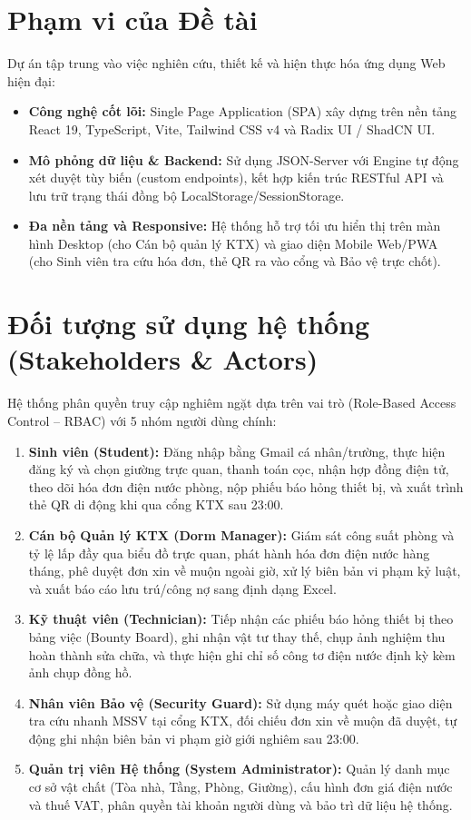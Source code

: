 \documentclass[12pt,a4paper,oneside]{report}
\begin{document}
\section{Phạm vi của Đề tài}
Dự án tập trung vào việc nghiên cứu, thiết kế và hiện thực hóa ứng dụng Web hiện đại:
\begin{itemize}
    \item \textbf{Công nghệ cốt lõi:} Single Page Application (SPA) xây dựng trên nền tảng React 19, TypeScript, Vite, Tailwind CSS v4 và Radix UI / ShadCN UI.
    \item \textbf{Mô phỏng dữ liệu \& Backend:} Sử dụng JSON-Server với Engine tự động xét duyệt tùy biến (custom endpoints), kết hợp kiến trúc RESTful API và lưu trữ trạng thái đồng bộ LocalStorage/SessionStorage.
    \item \textbf{Đa nền tảng và Responsive:} Hệ thống hỗ trợ tối ưu hiển thị trên màn hình Desktop (cho Cán bộ quản lý KTX) và giao diện Mobile Web/PWA (cho Sinh viên tra cứu hóa đơn, thẻ QR ra vào cổng và Bảo vệ trực chốt).
\end{itemize}

\section{Đối tượng sử dụng hệ thống (Stakeholders \& Actors)}
Hệ thống phân quyền truy cập nghiêm ngặt dựa trên vai trò (Role-Based Access Control -- RBAC) với 5 nhóm người dùng chính:
\begin{enumerate}
    \item \textbf{Sinh viên (Student):} Đăng nhập bằng Gmail cá nhân/trường, thực hiện đăng ký và chọn giường trực quan, thanh toán cọc, nhận hợp đồng điện tử, theo dõi hóa đơn điện nước phòng, nộp phiếu báo hỏng thiết bị, và xuất trình thẻ QR di động khi qua cổng KTX sau 23:00.
    \item \textbf{Cán bộ Quản lý KTX (Dorm Manager):} Giám sát công suất phòng và tỷ lệ lấp đầy qua biểu đồ trực quan, phát hành hóa đơn điện nước hàng tháng, phê duyệt đơn xin về muộn ngoài giờ, xử lý biên bản vi phạm kỷ luật, và xuất báo cáo lưu trú/công nợ sang định dạng Excel.
    \item \textbf{Kỹ thuật viên (Technician):} Tiếp nhận các phiếu báo hỏng thiết bị theo bảng việc (Bounty Board), ghi nhận vật tư thay thế, chụp ảnh nghiệm thu hoàn thành sửa chữa, và thực hiện ghi chỉ số công tơ điện nước định kỳ kèm ảnh chụp đồng hồ.
    \item \textbf{Nhân viên Bảo vệ (Security Guard):} Sử dụng máy quét hoặc giao diện tra cứu nhanh MSSV tại cổng KTX, đối chiếu đơn xin về muộn đã duyệt, tự động ghi nhận biên bản vi phạm giờ giới nghiêm sau 23:00.
    \item \textbf{Quản trị viên Hệ thống (System Administrator):} Quản lý danh mục cơ sở vật chất (Tòa nhà, Tầng, Phòng, Giường), cấu hình đơn giá điện nước và thuế VAT, phân quyền tài khoản người dùng và bảo trì dữ liệu hệ thống.
\end{enumerate}
\end{document}

